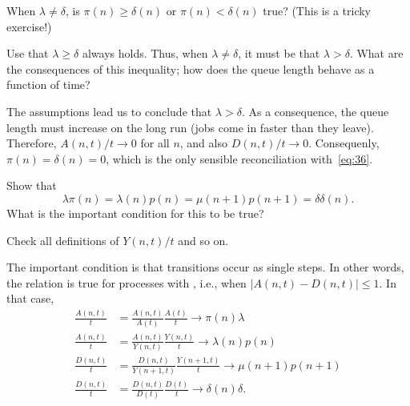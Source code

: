 \begin{exercise}\label{ex:26}
  When $\lambda\neq \delta$, is $\pi(n)\geq \delta(n)$ or $\pi(n) < \delta(n)$ true?  (This is a tricky exercise!) 
  \begin{hint}
    Use that    $\lambda \geq \delta$ always holds. Thus, when $\lambda \neq \delta$, it must be that $\lambda > \delta$. What are the consequences of this inequality; how does the queue length behave as a function of time?
  \end{hint}
  \begin{solution}
    The assumptions lead us to conclude that $\lambda > \delta$. As a consequence, the queue length must increase on the long run (jobs come in faster than they leave). Therefore, $A(n,t)/t \to 0$ for all $n$, and also $D(n,t)/t\to 0$. Consequenly, $\pi(n) = \delta(n) = 0$, which is the only sensible reconciliation with~\eqref{eq:36}. 
  \end{solution}
\end{exercise}

\begin{exercise}
Show that 
\begin{equation*}
\lambda  \pi(n) = \lambda(n) p(n) = \mu(n+1) p(n+1) = \delta \delta(n).
\end{equation*}
What is the important condition for this to be true?
\begin{hint}
Check all definitions of $Y(n,t)/t$ and so on.
\end{hint}
\begin{solution}
  The important condition is that transitions occur as single
  steps. In other words, the relation is true for processes with
  , i.e., when $|A(n,t) - D(n,t)|\leq 1$.
  In  that case, 
\begin{align*}
  \frac{A(n,t)}{t} &=   \frac{A(n,t)}{A(t)} \frac{A(t)}{t} \to \pi(n) \lambda\\
  \frac{A(n,t)}{t} &=   \frac{A(n,t)}{Y(n,t)} \frac{Y(n,t)}{t} \to \lambda(n)p(n)\\
  \frac{D(n,t)}{t} &=   \frac{D(n,t)}{Y(n+1,t)} \frac{Y(n+1,t)}{t} \to \mu(n+1)p(n+1)\\
  \frac{D(n,t)}{t} &=   \frac{D(n,t)}{D(t)} \frac{D(t)}{t} \to \delta(n)\delta. \\
\end{align*}
\end{solution}
\end{exercise}



